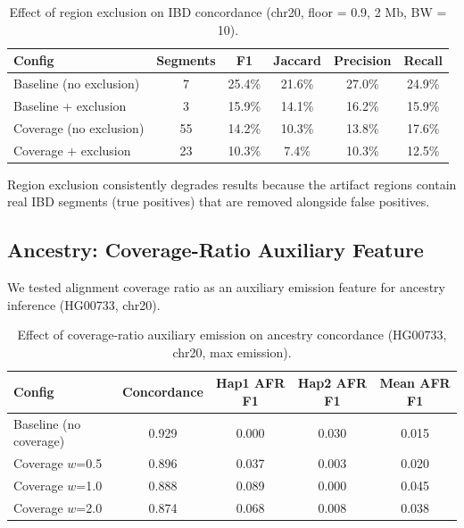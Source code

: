 \documentclass[11pt]{article}
\begin{document}
\begin{table}[ht]
\centering
\caption{Effect of region exclusion on IBD concordance (chr20, floor = 0.9, 2 Mb, BW = 10).}
\label{tab:region_exclusion}
\begin{tabular}{lccccc}
\hline
\textbf{Config} & \textbf{Segments} & \textbf{F1} & \textbf{Jaccard} & \textbf{Precision} & \textbf{Recall} \\
\hline
Baseline (no exclusion) & 7 & 25.4\% & 21.6\% & 27.0\% & 24.9\% \\
Baseline + exclusion & 3 & 15.9\% & 14.1\% & 16.2\% & 15.9\% \\
Coverage (no exclusion) & 55 & 14.2\% & 10.3\% & 13.8\% & 17.6\% \\
Coverage + exclusion & 23 & 10.3\% & 7.4\% & 10.3\% & 12.5\% \\
\hline
\end{tabular}
\end{table}

Region exclusion consistently degrades results because the artifact regions contain real IBD segments (true positives) that are removed alongside false positives.

\subsection{Ancestry: Coverage-Ratio Auxiliary Feature}
\label{sec:supp_ancestry_coverage}

We tested alignment coverage ratio as an auxiliary emission feature for ancestry inference (HG00733, chr20).

\begin{table}[ht]
\centering
\caption{Effect of coverage-ratio auxiliary emission on ancestry concordance (HG00733, chr20, max emission).}
\label{tab:ancestry_coverage}
\begin{tabular}{lcccc}
\hline
\textbf{Config} & \textbf{Concordance} & \textbf{Hap1 AFR F1} & \textbf{Hap2 AFR F1} & \textbf{Mean AFR F1} \\
\hline
Baseline (no coverage) & 0.929 & 0.000 & 0.030 & 0.015 \\
Coverage $w$=0.5 & 0.896 & 0.037 & 0.003 & 0.020 \\
Coverage $w$=1.0 & 0.888 & 0.089 & 0.000 & 0.045 \\
Coverage $w$=2.0 & 0.874 & 0.068 & 0.008 & 0.038 \\
\hline
\end{tabular}
\end{table}
\end{document}
